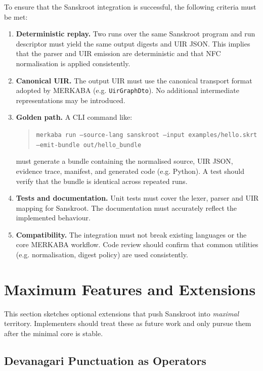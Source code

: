 \documentclass[12pt]{article}
\begin{document}
To ensure that the Sanskroot integration is successful, the following
criteria must be met:

\begin{enumerate}
  \item \textbf{Deterministic replay.} Two runs over the same Sanskroot
    program and run descriptor must yield the same output digests and UIR
    JSON.  This implies that the parser and UIR emission are deterministic
    and that NFC normalisation is applied consistently.

  \item \textbf{Canonical UIR.} The output UIR must use the canonical
    transport format adopted by MERKABA (e.g. \texttt{UirGraphDto}).  No
    additional intermediate representations may be introduced.

  \item \textbf{Golden path.} A CLI command like:
    \begin{quote}
      \texttt{merkaba run --source-lang sanskroot --input examples/hello.skrt \\
      --emit-bundle out/hello\_bundle}
    \end{quote}
    must generate a bundle containing the normalised source, UIR JSON,
    evidence trace, manifest, and generated code (e.g. Python).  A test
    should verify that the bundle is identical across repeated runs.

  \item \textbf{Tests and documentation.} Unit tests must cover the
    lexer, parser and UIR mapping for Sanskroot.  The documentation must
    accurately reflect the implemented behaviour.

  \item \textbf{Compatibility.} The integration must not break existing
    languages or the core MERKABA workflow.  Code review should confirm
    that common utilities (e.g. normalisation, digest policy) are used
    consistently.
\end{enumerate}

\section{Maximum Features and Extensions}
\label{sec:maximum}

This section sketches optional extensions that push Sanskroot into
\emph{maximal} territory.  Implementers should treat these as future work
and only pursue them after the minimal core is stable.

\subsection{Devanagari Punctuation as Operators}
\end{document}
